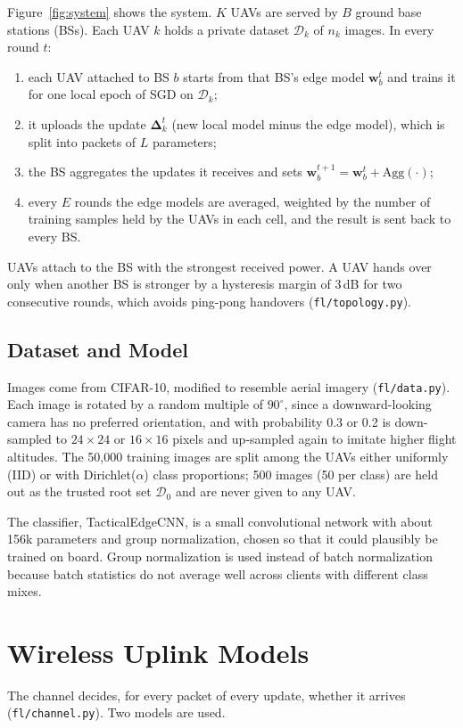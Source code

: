 Figure~\ref{fig:system} shows the system. $K$ UAVs are served by $B$ ground base
stations (BSs). Each UAV $k$ holds a private dataset $\mathcal{D}_k$ of $n_k$ images.
In every round $t$:
\begin{enumerate}
\item each UAV attached to BS $b$ starts from that BS's edge model $\mathbf{w}^t_b$
  and trains it for one local epoch of SGD on $\mathcal{D}_k$;
\item it uploads the update $\boldsymbol{\Delta}^t_k$ (new local model minus the edge
  model), which is split into packets of $L$ parameters;
\item the BS aggregates the updates it receives and sets
  $\mathbf{w}^{t+1}_b=\mathbf{w}^t_b+\mathrm{Agg}(\cdot)$;
\item every $E$ rounds the edge models are averaged, weighted by the number of
  training samples held by the UAVs in each cell, and the result is sent back to
  every BS.
\end{enumerate}
UAVs attach to the BS with the strongest received power. A UAV hands over only when
another BS is stronger by a hysteresis margin of 3\,dB for two consecutive rounds,
which avoids ping-pong handovers (\texttt{fl/topology.py}).

\subsection{Dataset and Model}
Images come from CIFAR-10, modified to resemble aerial imagery
(\texttt{fl/data.py}). Each image is rotated by a random multiple of
$90^\circ$, since a downward-looking camera has no preferred orientation, and with
probability 0.3 or 0.2 is down-sampled to $24\times24$ or $16\times16$ pixels and
up-sampled again to imitate higher flight altitudes. The 50{,}000 training images
are split among the UAVs either uniformly (IID) or with Dirichlet($\alpha$)
class proportions; 500 images (50 per class) are held out as the trusted root set
$\mathcal{D}_0$ and are never given to any UAV.

The classifier, TacticalEdgeCNN, is a small convolutional network with about 156k
parameters and group normalization, chosen so that it could plausibly be trained on
board. Group normalization is used instead of batch normalization because batch
statistics do not average well across clients with different class mixes.

\section{Wireless Uplink Models}
\label{sec:channel}
The channel decides, for every packet of every update, whether it arrives
(\texttt{fl/channel.py}). Two models are used.

